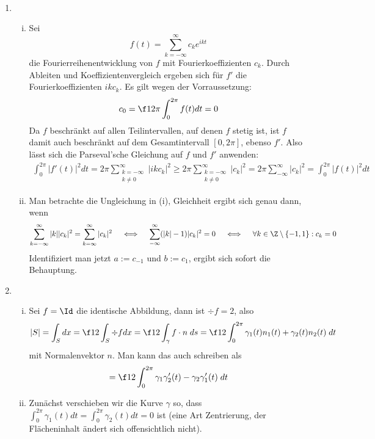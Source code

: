 \documentclass{mywork}
\begin{document}
	\setcounter{section}{10}

	\begin{aufgabe}~

		\begin{enumerate}[{Teil} A:]
			\item
				\begin{enumerate}[(i)]
					\item
						Sei
						\[
							f(t) = \sum_{k=-\infty}^\infty c_k e^{ikt}
						\]
						die Fourierreihenentwicklung von $f$ mit Fourierkoeffizienten $c_k$.
						Durch Ableiten und Koeffizientenvergleich ergeben sich für $f'$ die Fourierkoeffizienten $ikc_k$.
						Es gilt wegen der Vorraussetzung:
						\[
							c_0 = \f 1{2\pi}\int_0^{2\pi} f(t) dt = 0
						\]
						Da $f$ beschränkt auf allen Teilintervallen, auf denen $f$ stetig ist, ist $f$ damit auch beschränkt auf dem Gesamtintervall $[0,2\pi]$, ebenso $f'$.
						Also lässt sich die Parseval'sche Gleichung auf $f$ und $f'$ anwenden:
						\begin{align*}
							\int_0^{2\pi} |f'(t)|^2 dt
							= 2\pi \sum_{\substack{k=-\infty\\k\neq 0}}^\infty |ikc_k|^2
							\ge 2\pi \sum_{\substack{k=-\infty\\k\neq 0}}^\infty |c_k|^2
							= 2\pi \sum_{-\infty}^\infty |c_k|^2
							= \int_0^{2\pi} |f(t)|^2 dt
						\end{align*}
					\item
						Man betrachte die Ungleichung in (i), Gleichheit ergibt sich genau dann, wenn
						\begin{align*}
							\sum_{k=-\infty}^\infty |k||c_k|^2 = \sum_{k=\infty}^\infty |c_k|^2
							\quad \iff \quad \sum_{-\infty}^\infty (|k|-1)|c_k|^2 = 0 
							\quad \iff \quad \forall k\in \Z\setminus\{-1,1\} : c_k = 0
						\end{align*}
						Identifiziert man jetzt $a := c_{-1}$ und $b := c_1$, ergibt sich sofort die Behauptung.
				\end{enumerate}
			\item
				\begin{enumerate}[(i)]
					\item
						Sei $f = \Id$ die identische Abbildung, dann ist $\div f = 2$, also
						\[
							|S| = \int_S dx = \f 12 \int_S \div f dx = \f 12 \int_\gamma f \cdot n \; ds = \f 12 \int_0^{2\pi} \gamma_1(t) n_1(t) + \gamma_2(t) n_2(t) \; dt
						\]
						mit Normalenvektor $n$. Man kann das auch schreiben als
						\[
							= \f 12 \int_0^{2\pi} \gamma_1 \gamma_2'(t) - \gamma_2 \gamma_1'(t) \;dt
						\]
					\item
						Zunächst verschieben wir die Kurve $\gamma$ so, dass $\int_0^{2\pi} \gamma_1(t) dt = \int_0^{2\pi} \gamma_2(t) dt = 0$ ist (eine Art Zentrierung, der Flächeninhalt ändert sich offensichtlich nicht).


\end{enumerate}
\end{enumerate}
\end{aufgabe}
\end{document}

